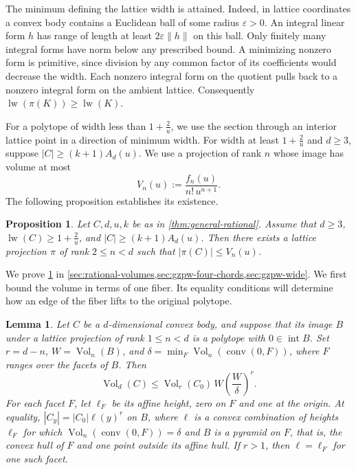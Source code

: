 \documentclass[reqno, 11pt]{article}
\numberwithin{equation}{section}
\newtheorem{proposition}[proposition]{Proposition}
\newtheorem{lemma}[lemma]{Lemma}
\theoremstyle{definition}
\DeclareMathOperator{\conv}{conv}
\DeclareMathOperator{\Vol}{Vol}
\DeclareMathOperator{\lw}{lw}
\DeclareMathOperator{\intr}{int}
\begin{document}
The minimum defining the lattice width is attained. Indeed,
in lattice coordinates a convex body contains a Euclidean ball of
some radius $\varepsilon>0$. An integral linear form $h$ has range
of length at least $2\varepsilon\|h\|$ on this ball. Only finitely
many integral forms have norm below any prescribed bound. A
minimizing nonzero form is primitive, since division by any common
factor of its coefficients would decrease the width. Each nonzero
integral form on the quotient pulls back to a nonzero integral form
on the ambient lattice. Consequently $\lw(\pi(K))\ge\lw(K)$.

For a polytope of width less than $1+\frac{2}{u}$, we use the section through
an interior lattice point in a direction of minimum width. For width
at least $1+\frac{2}{u}$ and $d\ge3$, suppose $|C|\ge(k+1)A_d(u)$. We use
a projection of rank $n$ whose
image has volume at most
\[
                     V_n(u):=\frac{f_n(u)}{n!\,u^{n+1}} .
\]
The following proposition establishes its existence.

\begin{proposition}\label{prop:projections}
Let $C,d,u,k$ be as in \cref{thm:general-rational}.
Assume that $d\ge3$, $\lw(C)\ge1+\frac{2}{u}$, and $|C|\ge(k+1)A_d(u)$.
Then there exists a lattice projection $\pi$ of rank $2\le n<d$
such that $|\pi(C)|\le V_n(u)$.
\end{proposition}

We prove \cref{prop:projections} in
\cref{sec:rational-volumes,sec:gzpw-four-chords,sec:gzpw-wide}.
We first bound the volume in terms of one fiber. Its equality conditions
will determine how an edge of the fiber lifts to the original polytope.

\begin{lemma}\label{lem:central-fiber-volume}
Let $C$ be a $d$-dimensional convex body, and suppose that its image
$B$ under a lattice projection of rank $1\le n<d$ is a polytope with
$0\in\intr B$. Set $r=d-n$, $W=\Vol_n(B)$, and
$\delta=\min_F\Vol_n(\conv(0,F))$, where $F$ ranges over the facets
of $B$. Then
\begin{equation}\label{eq:facet-volume}
                   \Vol_d(C)\le\Vol_r(C_0)\,W(\frac{W}{\delta})^r.
\end{equation}
For each facet $F$, let $\ell_F$ be its affine height, zero on $F$
and one at the origin. At equality, $|C_y|=|C_0|\ell(y)^r$ on $B$,
where $\ell$ is a convex combination of heights $\ell_F$ for which
$\Vol_n(\conv(0,F))=\delta$ and $B$ is a pyramid on $F$, that is,
the convex hull of $F$ and one point outside its affine hull.
If $r>1$, then $\ell=\ell_F$ for one such facet.
\end{lemma}
\end{document}
